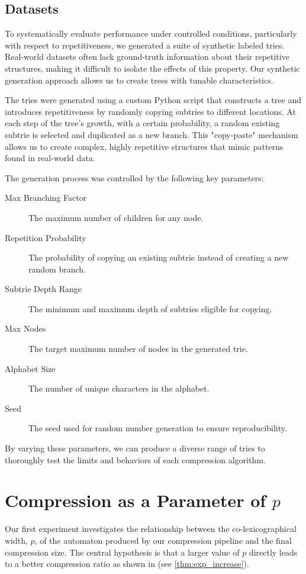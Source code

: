 \subsection{Datasets}
To systematically evaluate performance under controlled conditions, particularly with respect to repetitiveness, we generated a suite of synthetic labeled tries. Real-world datasets often lack ground-truth information about their repetitive structures, making it difficult to isolate the effects of this property. Our synthetic generation approach allows us to create trees with tunable characteristics.

The tries were generated using a custom Python script that constructs a tree and introduces repetitiveness by randomly copying subtries to different locations. At each step of the tree's growth, with a certain probability, a random existing subtrie is selected and duplicated as a new branch. This "copy-paste" mechanism allows us to create complex, highly repetitive structures that mimic patterns found in real-world data.

The generation process was controlled by the following key parameters:
\begin{description}
    \item[Max Branching Factor] The maximum number of children for any node.
    \item[Repetition Probability] The probability of copying an existing subtrie instead of creating a new random branch.
    \item[Subtrie Depth Range] The minimum and maximum depth of subtries eligible for copying.
    \item[Max Nodes] The target maximum number of nodes in the generated trie.
    \item[Alphabet Size] The number of unique characters in the alphabet.
    \item[Seed] The seed used for random number generation to ensure reproducibility.
\end{description}

By varying these parameters, we can produce a diverse range of tries to thoroughly test the limits and behaviors of each compression algorithm.

\section{Compression as a Parameter of \texorpdfstring{$p$}{p}}
Our first experiment investigates the relationship between the co-lexicographical width, $p$, of the automaton produced by our compression pipeline and the final compression size. The central hypothesis is that a larger value of $p$ directly leads to a better compression ratio as shown in \cite{manziniRationalConstructionWheeler2024} (see \cref{thm:exp_increase}). 

